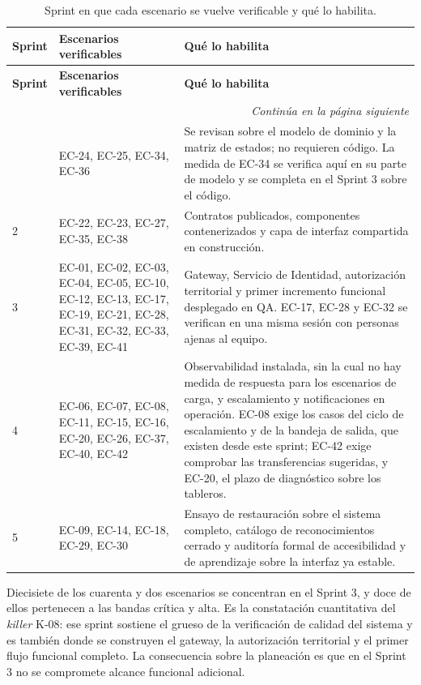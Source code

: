 \documentclass[11pt,a4paper]{article}
\newcommand{\contlinea}[1]{\multicolumn{#1}{r}{\footnotesize\itshape Continúa en la página siguiente}}
\begin{document}
\begin{longtable}{L{1.4cm} L{7.4cm} L{5.6cm}}
\caption{Sprint en que cada escenario se vuelve verificable y qué lo habilita.}\label{tab:verificacionec}\\
\toprule
\textbf{Sprint} & \textbf{Escenarios verificables} & \textbf{Qué lo habilita} \\
\midrule
\endfirsthead
\toprule
\textbf{Sprint} & \textbf{Escenarios verificables} & \textbf{Qué lo habilita} \\
\midrule
\endhead
\midrule
\contlinea{3} \\
\endfoot
\bottomrule
{} & EC-24, EC-25, EC-34, EC-36 & Se revisan sobre el modelo de dominio y la matriz de estados; no requieren código. La medida de EC-34 se verifica aquí en su parte de modelo y se completa en el Sprint 3 sobre el código. \\
2 & EC-22, EC-23, EC-27, EC-35, EC-38 & Contratos publicados, componentes contenerizados y capa de interfaz compartida en construcción. \\
3 & EC-01, EC-02, EC-03, EC-04, EC-05, EC-10, EC-12, EC-13, EC-17, EC-19, EC-21, EC-28, EC-31, EC-32, EC-33, EC-39, EC-41 & Gateway, Servicio de Identidad, autorización territorial y primer incremento funcional desplegado en QA. EC-17, EC-28 y EC-32 se verifican en una misma sesión con personas ajenas al equipo. \\
4 & EC-06, EC-07, EC-08, EC-11, EC-15, EC-16, EC-20, EC-26, EC-37, EC-40, EC-42 & Observabilidad instalada, sin la cual no hay medida de respuesta para los escenarios de carga, y escalamiento y notificaciones en operación. EC-08 exige los casos del ciclo de escalamiento y de la bandeja de salida, que existen desde este sprint; EC-42 exige comprobar las transferencias sugeridas, y EC-20, el plazo de diagnóstico sobre los tableros. \\
5 & EC-09, EC-14, EC-18, EC-29, EC-30 & Ensayo de restauración sobre el sistema completo, catálogo de reconocimientos cerrado y auditoría formal de accesibilidad y de aprendizaje sobre la interfaz ya estable. \\
\end{longtable}

\noindent Diecisiete de los cuarenta y dos escenarios se concentran en el Sprint 3, y doce de ellos pertenecen a las bandas crítica y alta. Es la constatación cuantitativa del \emph{killer} K-08: ese sprint sostiene el grueso de la verificación de calidad del sistema y es también donde se construyen el gateway, la autorización territorial y el primer flujo funcional completo. La consecuencia sobre la planeación es que en el Sprint 3 no se compromete alcance funcional adicional.
\end{document}
